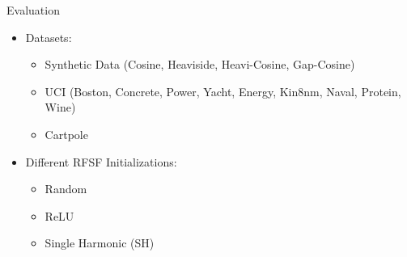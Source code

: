 \documentclass[
	USenglish,
	aspectratio=43,
	color={accentcolor=1c},
	logo=true,
	colorframetitle=true,
	hyperref={pdfpagelabels=true},
]{tudabeamer}
\begin{document}
		\begin{frame}{Evaluation}
			\begin{itemize}
				\item<+-> Datasets:
					\begin{itemize}
						\item Synthetic Data (Cosine, Heaviside, Heavi-Cosine, Gap-Cosine)
						\item UCI (Boston, Concrete, Power, Yacht, Energy, Kin8nm, Naval, Protein, Wine)
						\item Cartpole
					\end{itemize}
				\item<+-> Different RFSF Initializations:
					\begin{itemize}
						\item Random
						\item ReLU
						\item Single Harmonic (SH)
					\end{itemize}
			\end{itemize}
		\end{frame}
\end{document}
